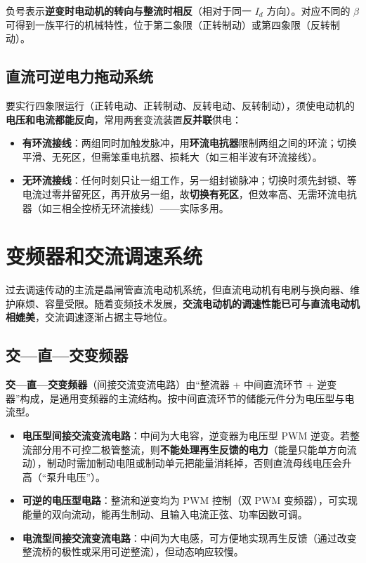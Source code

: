 
负号表示\textbf{逆变时电动机的转向与整流时相反}（相对于同一 $I_d$ 方向）。对应不同的 $\beta$ 可得到一族平行的机械特性，位于第二象限（正转制动）或第四象限（反转制动）。

\subsection{直流可逆电力拖动系统}

要实行四象限运行（正转电动、正转制动、反转电动、反转制动），须使电动机的\textbf{电压和电流都能反向}，常用两套变流装置\textbf{反并联}供电：

\begin{itemize}
  \item \textbf{有环流接线}：两组同时加触发脉冲，用\textbf{环流电抗器}限制两组之间的环流；切换平滑、无死区，但需笨重电抗器、损耗大（如三相半波有环流接线）。
  \item \textbf{无环流接线}：任何时刻只让一组工作，另一组封锁脉冲；切换时须先封锁、等电流过零并留死区，再开放另一组，故\textbf{切换有死区}，但效率高、无需环流电抗器（如三相全控桥无环流接线）——实际多用。
\end{itemize}

\section{变频器和交流调速系统}

过去调速传动的主流是晶闸管直流电动机系统，但直流电动机有电刷与换向器、维护麻烦、容量受限。随着变频技术发展，\textbf{交流电动机的调速性能已可与直流电动机相媲美}，交流调速逐渐占据主导地位。

\subsection{交—直—交变频器}

\textbf{交—直—交变频器}（间接交流变流电路）由“整流器 + 中间直流环节 + 逆变器”构成，是通用变频器的主流结构。按中间直流环节的储能元件分为电压型与电流型。

\begin{itemize}
  \item \textbf{电压型间接交流变流电路}：中间为大电容，逆变器为电压型 PWM 逆变。若整流部分用不可控二极管整流，则\textbf{不能处理再生反馈的电力}（能量只能单方向流动），制动时需加制动电阻或制动单元把能量消耗掉，否则直流母线电压会升高（“泵升电压”）。
  \item \textbf{可逆的电压型电路}：整流和逆变均为 PWM 控制（双 PWM 变频器），可实现能量的双向流动，能再生制动、且输入电流正弦、功率因数可调。
  \item \textbf{电流型间接交流变流电路}：中间为大电感，可方便地实现再生反馈（通过改变整流桥的极性或采用可逆整流），但动态响应较慢。
\end{itemize}

